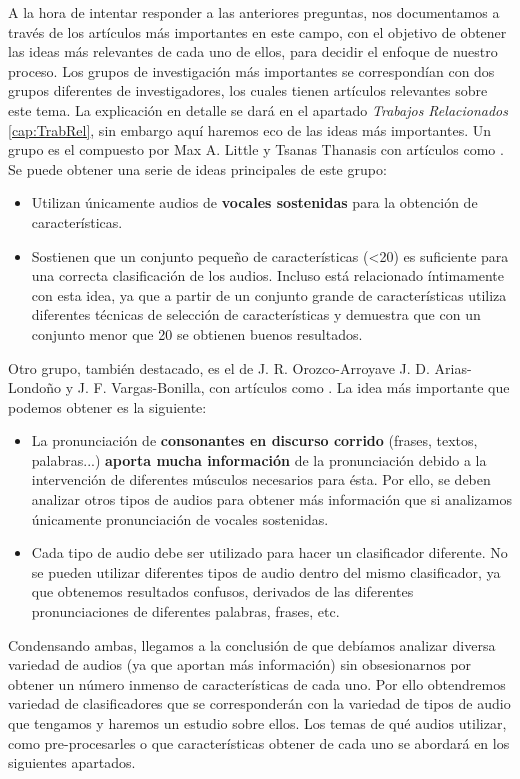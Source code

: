 A la hora de intentar responder a las anteriores preguntas, nos documentamos a través de los artículos más importantes en este campo, con el objetivo de obtener las ideas más relevantes de cada uno de ellos, para decidir el enfoque de nuestro proceso. Los grupos de investigación más importantes se correspondían con dos grupos diferentes de investigadores, los cuales tienen artículos relevantes sobre este tema. La explicación en detalle se dará en el apartado \textit{Trabajos Relacionados} \ref{cap:TrabRel}, sin embargo aquí haremos eco de las ideas más importantes.
Un grupo es el compuesto por Max A. Little y Tsanas Thanasis con artículos como \cite{MxLtSuitability}. Se puede obtener una serie de ideas principales de este grupo:
\begin{itemize}
\item Utilizan únicamente audios de \textbf{vocales sostenidas} para la obtención de características.
\item Sostienen que un conjunto pequeño de características (<20) es suficiente para una correcta clasificación de los audios. Incluso \cite{MxLtNovel} está relacionado íntimamente con esta idea, ya que a partir de un conjunto grande de características utiliza diferentes técnicas de selección de características y demuestra que con un conjunto menor que 20 se obtienen buenos resultados.
\end{itemize}

Otro grupo, también destacado, es el de J. R. Orozco-Arroyave J. D. Arias-Londoño y J. F. Vargas-Bonilla, con artículos como \cite{Orz2016}. La idea más importante que podemos obtener es la siguiente:
\begin{itemize}
\item La pronunciación de \textbf{consonantes en discurso corrido} (frases, textos, palabras...) \textbf{aporta mucha información} de la pronunciación debido a la intervención de diferentes músculos necesarios para ésta. Por ello, se deben analizar otros tipos de audios para obtener más información que si analizamos únicamente pronunciación de vocales sostenidas.
\item Cada tipo de audio debe ser utilizado para hacer un clasificador diferente. No se pueden utilizar diferentes tipos de audio dentro del mismo clasificador, ya que obtenemos resultados confusos, derivados de las diferentes pronunciaciones de diferentes palabras, frases, etc.
\end{itemize}


\begin{tcolorbox}
Condensando ambas, llegamos a la conclusión de que debíamos analizar diversa variedad de audios (ya que aportan más información) sin obsesionarnos por obtener un número inmenso de características de cada uno. Por ello obtendremos variedad de clasificadores que se corresponderán con la variedad de tipos de audio que tengamos y haremos un estudio sobre ellos. Los temas de qué audios utilizar, como pre-procesarles o que características obtener de cada uno se abordará en los siguientes apartados.
\end{tcolorbox}

